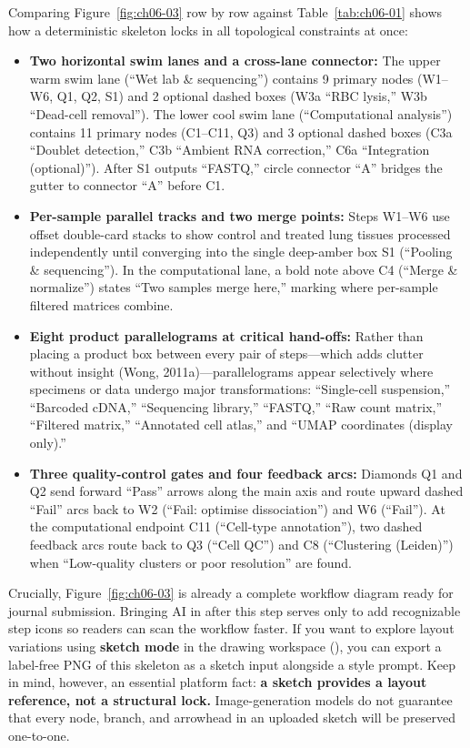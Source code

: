 Comparing Figure~\ref{fig:ch06-03} row by row against Table~\ref{tab:ch06-01} shows how a deterministic skeleton locks in all topological constraints at once:
\begin{itemize}
\item \textbf{Two horizontal swim lanes and a cross-lane connector:} The upper warm swim lane (``Wet lab \& sequencing'') contains 9 primary nodes (W1--W6, Q1, Q2, S1) and 2 optional dashed boxes (W3a ``RBC lysis,'' W3b ``Dead-cell removal''). The lower cool swim lane (``Computational analysis'') contains 11 primary nodes (C1--C11, Q3) and 3 optional dashed boxes (C3a ``Doublet detection,'' C3b ``Ambient RNA correction,'' C6a ``Integration (optional)''). After S1 outputs ``FASTQ,'' circle connector ``A'' bridges the gutter to connector ``A'' before C1.
\item \textbf{Per-sample parallel tracks and two merge points:} Steps W1--W6 use offset double-card stacks to show control and treated lung tissues processed independently until converging into the single deep-amber box S1 (``Pooling \& sequencing''). In the computational lane, a bold note above C4 (``Merge \& normalize'') states ``Two samples merge here,'' marking where per-sample filtered matrices combine.
\item \textbf{Eight product parallelograms at critical hand-offs:} Rather than placing a product box between every pair of steps—which adds clutter without insight (Wong, 2011a)—parallelograms appear selectively where specimens or data undergo major transformations: ``Single-cell suspension,'' ``Barcoded cDNA,'' ``Sequencing library,'' ``FASTQ,'' ``Raw count matrix,'' ``Filtered matrix,'' ``Annotated cell atlas,'' and ``UMAP coordinates (display only).''
\item \textbf{Three quality-control gates and four feedback arcs:} Diamonds Q1 and Q2 send forward ``Pass'' arrows along the main axis and route upward dashed ``Fail'' arcs back to W2 (``Fail: optimise dissociation'') and W6 (``Fail''). At the computational endpoint C11 (``Cell-type annotation''), two dashed feedback arcs route back to Q3 (``Cell QC'') and C8 (``Clustering (Leiden)'') when ``Low-quality clusters or poor resolution'' are found.
\end{itemize}

Crucially, Figure~\ref{fig:ch06-03} is already a complete workflow diagram ready for journal submission. Bringing AI in after this step serves only to add recognizable step icons so readers can scan the workflow faster. If you want to explore layout variations using \textbf{sketch mode} in the \scidraw{} drawing workspace (), you can export a label-free PNG of this skeleton as a sketch input alongside a style prompt. Keep in mind, however, an essential platform fact: \textbf{a sketch provides a layout reference, not a structural lock.} Image-generation models do not guarantee that every node, branch, and arrowhead in an uploaded sketch will be preserved one-to-one.

